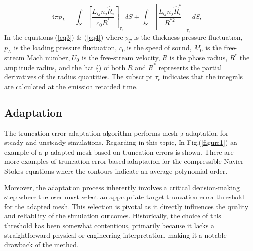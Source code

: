 \documentclass{article}
\begin{document}
		\begin{equation}
  \label{eq4}
			4\pi p_L = \int_S \left[\frac{\dot{L}_{ij}  n_j\hat{R}_i}{{c_0 R^*}}\right ]_{\tau_{e}} \, dS + \int_S \left[\frac{\dot{L}_{ij} n_j \hat{R}^*_i}{{R^{*2}}}\right ]_{\tau_{e}} \, dS,
		\end{equation}
		In the equations (\ref{eq3}) \& (\ref{eq4}) where $p_T$ is the thickness pressure fluctuation, $p_L$ is the loading pressure fluctuation, $c_0$ is the speed of sound, $M_0$ is the free-stream Mach number, $U_0$ is the free-stream velocity, $R$ is the phase radius, $R^*$ the amplitude radius, and the hat ($\hat{}$) of both $R$ and $R^*$ represents the partial derivatives of the radius quantities. The subscript $\tau_e$ indicates that the integrals are calculated at the emission retarded time.
  

		\subsection{Adaptation}
		The truncation error adaptation algorithm performs mesh p-adaptation for steady and unsteady simulations. Regarding in this topic,	In Fig.(\ref{figure1}) an example of a p-adapted mesh based on truncation errors is shown. There are more examples of truncation error-based adaptation for the compressible Navier-Stokes equations where the contours indicate an average polynomial order.
  
  Moreover, the adaptation process inherently involves a critical decision-making step where the user must select an appropriate target truncation error threshold for the adapted mesh. This selection is pivotal as it directly influences the quality and reliability of the simulation outcomes. Historically, the choice of this threshold has been somewhat contentious, primarily because it lacks a straightforward physical or engineering interpretation, making it a notable drawback of the method.
   
\end{document}
